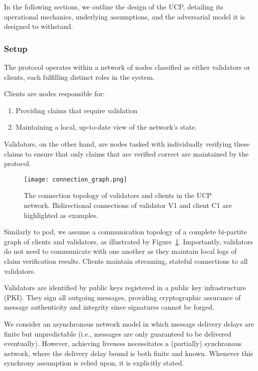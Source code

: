 \documentclass{article}
\newcommand{\UC}{UCP}
\begin{document}
In the following sections, we outline the design of the \UC{}, detailing its operational mechanics, underlying assumptions, and the adversarial model it is designed to withstand.

\subsubsection{Setup}

The protocol operates within a network of nodes classified as either validators or clients, each fulfilling distinct roles in the system.

Clients are nodes responsible for:

\begin{enumerate}
    \item Providing claims that require validation
    \item Maintaining a local, up-to-date view of the network’s state.
\end{enumerate}

Validators, on the other hand, are nodes tasked with individually verifying these claims to ensure that only claims that are verified correct are maintained by the protocol.

\begin{figure}
    \centering
    \texttt{[image: connection\_graph.png]}
    \caption{The connection topology of validators and clients in the \UC{} network. Bidirectional connections of validator V1 and client C1 are highlighted as examples.}
    \label{fig:uc_connections_graph}
\end{figure}

Similarly to pod, we assume a communication topology of a complete bi-partite graph of clients and validators, as illustrated by Figure~\ref{fig:uc_connections_graph}. Importantly, validators do not need to communicate with one another as they maintain local logs of claim verification results. Clients maintain streaming, stateful connections to all validators.

Validators are identified by public keys registered in a public key infrastructure (PKI). They sign all outgoing messages, providing cryptographic assurance of message authenticity and integrity since signatures cannot be forged.

We consider an asynchronous network model in which message delivery delays are finite but unpredictable (i.e., messages are only guaranteed to be delivered eventually). However, achieving liveness necessitates a (partially) synchronous network, where the delivery delay bound is both finite and known. Whenever this synchrony assumption is relied upon, it is explicitly stated.
\end{document}
